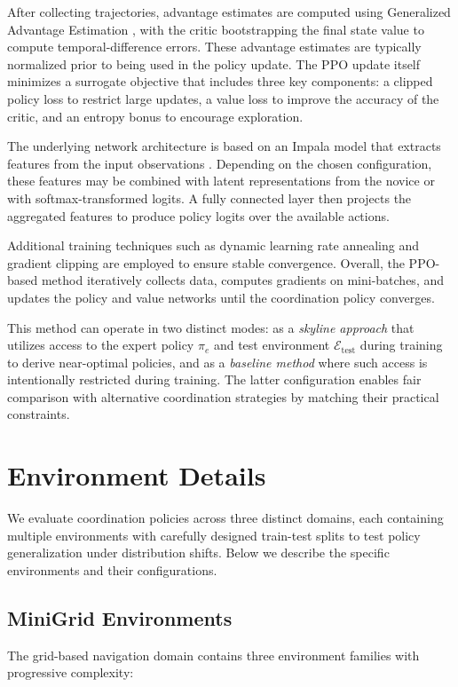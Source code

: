 After collecting trajectories, advantage estimates are computed using Generalized Advantage Estimation \citep{Schulmanetal_ICLR2016}, with the critic bootstrapping the final state value to compute temporal-difference errors. These advantage estimates are typically normalized prior to being used in the policy update. The PPO update itself minimizes a surrogate objective that includes three key components: a clipped policy loss to restrict large updates, a value loss to improve the accuracy of the critic, and an entropy bonus to encourage exploration.

The underlying network architecture is based on an Impala model that extracts features from the input observations \citep{espeholt2018impala}. Depending on the chosen configuration, these features may be combined with latent representations from the novice or with softmax-transformed logits. A fully connected layer then projects the aggregated features to produce policy logits over the available actions.

Additional training techniques such as dynamic learning rate annealing and gradient clipping are employed to ensure stable convergence. Overall, the PPO-based method iteratively collects data, computes gradients on mini-batches, and updates the policy and value networks until the coordination policy converges.

This method can operate in two distinct modes: as a \textit{skyline approach} that utilizes access to the expert policy $\pi_e$ and test environment $\mathcal{E}_{\text{test}}$ during training to derive near-optimal policies, and as a \textit{baseline method} where such access is intentionally restricted during training. The latter configuration enables fair comparison with alternative coordination strategies by matching their practical constraints.


\clearpage

\section{Environment Details}\label{app:envs}

We evaluate coordination policies across three distinct domains, each containing multiple environments with carefully designed train-test splits to test policy generalization under distribution shifts. Below we describe the specific environments and their configurations.

\subsection{MiniGrid Environments}
The grid-based navigation domain contains three environment families with progressive complexity:

